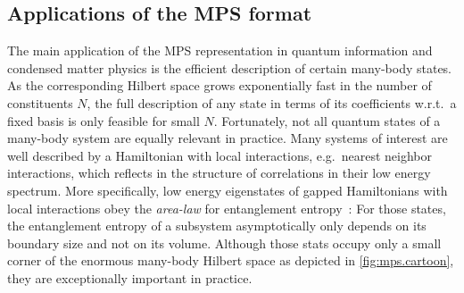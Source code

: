 \subsection{Applications of the MPS format}%
\label{sub:mps.applications}

\begin{figure*}[t]
  \centering
  \caption{\label{fig:mps.cartoon}%
    The manifold of quantum states with an efficient MPS description occupies only a tiny corner in the full Hilbert space.
  }
\end{figure*}

The main application of the MPS representation in quantum information and condensed matter physics is the efficient description of certain many-body states.
As the corresponding Hilbert space grows exponentially fast in the number of constituents $N$, the full description of any state in terms of its coefficients w.r.t.\ a fixed basis is only feasible for small $N$.
Fortunately, not all quantum states of a many-body system are equally relevant in practice.
Many systems of interest are well described by a Hamiltonian with local interactions, e.g.\ nearest neighbor interactions, which reflects in the structure of correlations in their low energy spectrum.
More specifically, low energy eigenstates of gapped Hamiltonians with local interactions obey the \emph{area-law} for entanglement entropy~\cite{Hastings_2006_Solving,Verstraete_2006_Matrix,Eisert_2010_Colloquium}:
For those states, the entanglement entropy of a subsystem asymptotically only depends on its boundary size and not on its volume.
Although those stats occupy only a small corner of the enormous many-body Hilbert space as depicted in \cref{fig:mps.cartoon}, they are exceptionally important in practice.

